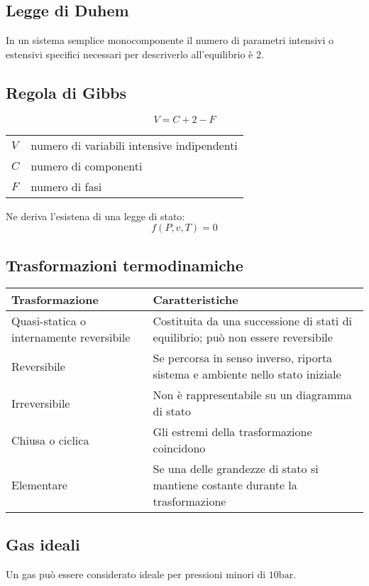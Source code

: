 \subsection{Legge di Duhem}
In un sistema semplice monocomponente il numero di parametri intensivi o estensivi specifici
necessari per descriverlo all'equilibrio è 2.


\subsection{Regola di Gibbs}
\[V = C + 2 - F\]

\begin{tabular}{ll}
    $V$ & numero di variabili intensive indipendenti \\
    $C$ & numero di componenti \\
    $F$ & numero di fasi \\
\end{tabular}

Ne deriva l'esistena di una legge di stato:
\[f(P, v, T) = 0\]

\subsection{Trasformazioni termodinamiche}
\begin{tabular}{p{3.1cm}p{4cm}}
    \toprule
    Trasformazione & Caratteristiche \\
    \midrule
    Quasi-statica o \newline internamente reversibile & Costituita da una successione di stati di equilibrio; può non essere reversibile \\
    Reversibile & Se percorsa in senso inverso, riporta sistema e ambiente nello stato iniziale \\
    Irreversibile & Non è rappresentabile su un diagramma di stato \\
    Chiusa o ciclica & Gli estremi della trasformazione coincidono \\
    Elementare & Se una delle grandezze di stato si mantiene costante durante la trasformazione \\
    \bottomrule
\end{tabular}

\subsection{Gas ideali}
Un gas può essere considerato ideale per pressioni minori di $\si{10\bar}$.

